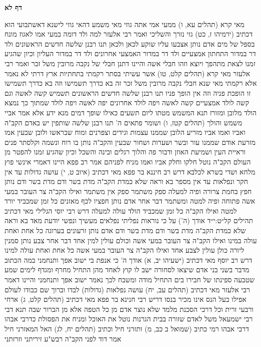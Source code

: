 \documentclass[12pt, openany]{book}
\newcommand{\sethebfont}{
\fontsize{10.5pt}{21.0pt} \selectfont
}
\newcommand{\twocol}[1]{
	{\sethebfont \begin{multicols}{2}
			#1
	\end{multicols}}	
}
\newcommand{\sectname}{}
\newcommand{\newsection}[1]{
	\addcontentsline{toc}{section}{#1}
	\renewcommand{\sectname}{#1}	
	\vspace{-\baselineskip}
	\begin{center}
		\textbf{%
\fontsize{16pt}{16pt}\selectfont
			#1}
	\end{center}
	\vspace{-\baselineskip}
	\nopagebreak
}
\begin{document}
\newsection{דף לא}
\twocol{מאי קרא (תהלים עא, ו) ממעי אמי אתה גוזי  מאי משמע דהאי גוזי לישנא דאשתבועי הוא  דכתיב  (ירמיהו ז, כט) גזי נזרך והשליכי 
ואמר רבי אלעזר  למה ולד דומה במעי אמו  לאגוז מונח בספל של מים אדם נותן אצבעו עליו שוקע לכאן ולכאן 
תנו רבנן  שלשה חדשים הראשונים ולד דר במדור התחתון אמצעיים ולד דר במדור האמצעי אחרונים ולד דר במדור העליון וכיון שהגיע זמנו לצאת מתהפך ויוצא וזהו חבלי אשה 
והיינו דתנן  חבלי של נקבה מרובין משל זכר 
ואמר רבי אלעזר  מאי קרא  (תהלים קלט, טו) אשר עשיתי בסתר רקמתי בתחתיות ארץ  דרתי לא נאמר אלא רקמתי
מאי שנא  חבלי נקבה מרובין משל זכר  זה בא כדרך תשמישו וזה בא כדרך תשמישו זו הופכת פניה וזה אין הופך פניו 
תנו רבנן  שלשה חדשים הראשונים תשמיש קשה לאשה וגם קשה לולד אמצעיים קשה לאשה ויפה לולד אחרונים יפה לאשה ויפה לולד שמתוך כך נמצא הולד מלובן ומזורז 
תנא  המשמש מטתו ליום תשעים כאילו שופך דמים  מנא ידע  אלא אמר אביי  משמש והולך (תהלים קטז, ו) ושומר פתאים ה' 
תנו רבנן  שלשה שותפין יש באדם הקב"ה ואביו ואמו  אביו מזריע הלובן שממנו עצמות וגידים וצפרנים ומוח שבראשו ולובן שבעין  אמו מזרעת אודם שממנו עור ובשר ושערות ושחור שבעין  והקב"ה נותן בו רוח ונשמה וקלסתר פנים וראיית העין ושמיעת האוזן ודבור פה והלוך רגלים ובינה והשכל 
וכיון שהגיע זמנו להפטר מן העולם הקב"ה נוטל חלקו וחלק אביו ואמו מניח לפניהם  אמר רב פפא  היינו דאמרי אינשי פוץ מלחא ושדי בשרא לכלבא 
דרש רב חיננא בר פפא  מאי דכתיב (איוב ט, י) עושה גדולות עד אין חקר ונפלאות עד אין מספר בא וראה שלא כמדת הקב"ה מדת בשר ודם  מדת בשר ודם נותן חפץ בחמת צרורה ופיה למעלה  ספק משתמר ספק אין משתמר  ואילו הקב"ה צר העובר במעי אשה פתוחה ופיה למטה ומשתמר 
דבר אחר  אדם נותן חפציו לכף מאזנים כל זמן שמכביד יורד למטה  ואילו הקב"ה כל זמן שמכביד הולד עולה למעלה 
דרש רבי יוסי הגלילי  מאי דכתיב {תהילים קל״ט:י״ד } אודך (ה') על כי נוראות נפליתי נפלאים מעשיך ונפשי יודעת מאד  בא וראה שלא כמדת הקב"ה מדת בשר ודם  מדת בשר ודם אדם נותן זרעונים בערוגה כל אחת ואחת עולה במינו  ואילו הקב"ה צר העובר במעי אשה וכולם עולין למין אחד 
דבר אחר  צבע נותן סמנין ליורה כולן עולין לצבע אחד  ואילו הקב"ה צר העובר במעי אשה כל אחת ואחת עולה למינו 
דרש רב יוסף  מאי דכתיב (ישעיהו יב, א) אודך ה' כי אנפת בי ישוב אפך ותנחמני במה הכתוב מדבר 
בשני בני אדם שיצאו לסחורה  ישב לו קוץ לאחד מהן התחיל מחרף ומגדף  לימים שמע שטבעה ספינתו של חבירו בים התחיל מודה ומשבח  לכך נאמר ישוב אפך ותנחמני 
והיינו דאמר רבי אלעזר  מאי דכתיב (תהלים עב, יח) עושה נפלאות (גדולות) לבדו  וברוך שם כבודו לעולם  אפילו בעל הנס אינו מכיר בנסו 
דריש רבי חנינא בר פפא  מאי דכתיב (תהלים קלט, ג) ארחי ורבעי זרית וכל דרכי הסכנת  מלמד שלא נוצר אדם מן כל הטפה אלא מן הברור שבה  תנא דבי רבי ישמעאל  משל לאדם שזורה בבית הגרנות נוטל את האוכל ומניח את הפסולת 
כדרבי אבהו דרבי אבהו רמי  כתיב (שמואל ב כב, מ) ותזרני חיל וכתיב (תהלים יח, לג) האל המאזרני חיל אמר דוד לפני הקב"ה  רבש"ע זיריתני וזרזתני 
}
\end{document}
